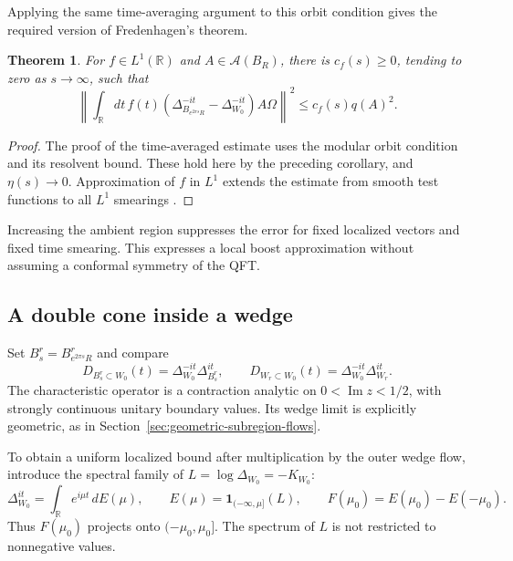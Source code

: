 \documentclass[a4paper,11pt]{article}
\newtheorem{theorem}{Theorem}
\theoremstyle{definition}
\begin{document}
Applying the same time-averaging argument to this orbit condition gives the required version of Fredenhagen's theorem.
\begin{theorem}\label{theorem:modifiedfredenhagen}
For $f\in L^1(\mathbb R)$ and $A\in\mathcal A(B_R)$, there is $c_f(s)\geq0$, tending to zero as $s\to\infty$, such that
\begin{equation}
 \left\|\int_{\mathbb R}dt\,f(t)
 (\Delta_{B_{e^{2\pi s}R}}^{-it}-\Delta_{W_0}^{-it})A\Omega\right\|^2
 \leq c_f(s)q(A)^2.
 \label{eq:approx-growing-flow}
\end{equation}
\end{theorem}
\begin{proof}
The proof of the time-averaged estimate uses the modular orbit condition and its resolvent bound. These hold here by the preceding corollary, and $\eta(s)\to0$. Approximation of $f$ in $L^1$ extends the estimate from smooth test functions to all $L^1$ smearings \cite{fredenhagen}.
\end{proof}
Increasing the ambient region suppresses the error for fixed localized vectors and fixed time smearing. This expresses a local boost approximation without assuming a conformal symmetry of the QFT.

\subsection{A double cone inside a wedge}\label{subsection:coneinsidewedge}

Set $B_s^r=B_{e^{2\pi s}R}^r$ and compare
\begin{equation}
 D_{B_s^r\subset W_0}(t)=\Delta_{W_0}^{-it}\Delta_{B_s^r}^{it},
 \qquad D_{W_r\subset W_0}(t)=\Delta_{W_0}^{-it}\Delta_{W_r}^{it}.
\end{equation}
The characteristic operator is a contraction analytic on $0<\operatorname{Im}z<1/2$, with strongly continuous unitary boundary values. Its wedge limit is explicitly geometric, as in Section~\ref{sec:geometric-subregion-flows}.

To obtain a uniform localized bound after multiplication by the outer wedge flow, introduce the spectral family of $L=\log\Delta_{W_0}=-K_{W_0}$:
\begin{equation}
 \Delta_{W_0}^{it}=\int_{\mathbb R}e^{i\mu t}\,dE(\mu),
 \qquad E(\mu)=\mathbf1_{(-\infty,\mu]}(L),
 \qquad F(\mu_0)=E(\mu_0)-E(-\mu_0).
 \label{eq:approx-spectral-cutoff}
\end{equation}
Thus $F(\mu_0)$ projects onto $(-\mu_0,\mu_0]$. The spectrum of $L$ is not restricted to nonnegative values.
\end{document}
